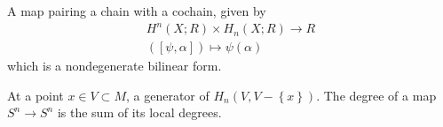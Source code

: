 \begin{definition}

A map pairing a chain with a cochain, given by
\begin{align*}
H^n(X; R) \times H_{n}(X; R) \to R \\ ([\psi, \alpha]) \mapsto \psi(\alpha)
\end{align*}
which is a nondegenerate bilinear form.

\end{definition}

\begin{definition}

\end{definition}


\begin{definition}

\end{definition}


\begin{definition}

\end{definition}


\begin{definition}

\end{definition}


\begin{definition}

At a point \(x \in V \subset M\), a generator of
\(H_{n}(V, V-\left\{{x}\right\})\). The degree of a map \(S^n \to S^n\)
is the sum of its local degrees.

\end{definition}

\begin{definition}

\end{definition}


\begin{definition}[Limit]

\end{definition}


